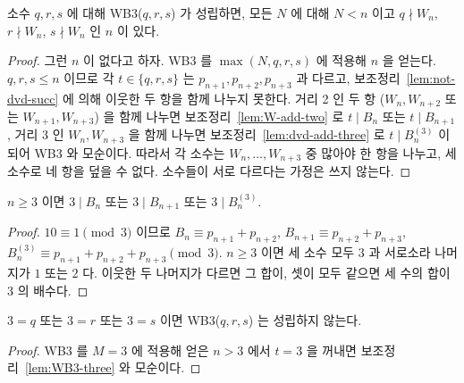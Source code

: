 \begin{theorem}[WB3 에서 Q1, \(S = \{q, r, s\}\)]
  \label{thm:three-of-window}
  \leanok
  소수 \(q, r, s\) 에 대해 WB3(\(q, r, s\)) 가 성립하면, 모든 \(N\) 에 대해 \(N < n\) 이고
  \(q \nmid W_n\), \(r \nmid W_n\), \(s \nmid W_n\) 인 \(n\) 이 있다.
\end{theorem}
\begin{proof}
  \leanok
  그런 \(n\) 이 없다고 하자. WB3 를 \(\max(N, q, r, s)\) 에 적용해 \(n\) 을 얻는다.
  \(q, r, s \le n\) 이므로 각 \(t \in \{q, r, s\}\) 는 \(p_{n+1}, p_{n+2}, p_{n+3}\) 과 다르고,
  보조정리~\ref{lem:not-dvd-succ} 에 의해 이웃한 두 항을 함께 나누지 못한다. 거리 2 인 두 항
  (\(W_n, W_{n+2}\) 또는 \(W_{n+1}, W_{n+3}\)) 을 함께 나누면 보조정리~\ref{lem:W-add-two} 로
  \(t \mid B_n\) 또는 \(t \mid B_{n+1}\), 거리 3 인 \(W_n, W_{n+3}\) 을 함께 나누면
  보조정리~\ref{lem:dvd-add-three} 로 \(t \mid B^{(3)}_n\) 이 되어 WB3 와 모순이다.
  따라서 각 소수는 \(W_n, \dots, W_{n+3}\) 중 많아야 한 항을 나누고, 세 소수로 네 항을 덮을 수 없다.
  소수들이 서로 다르다는 가정은 쓰지 않는다.
\end{proof}

\begin{lemma}
  \label{lem:WB3-three}
  \leanok
  \(n \ge 3\) 이면 \(3 \mid B_n\) 또는 \(3 \mid B_{n+1}\) 또는 \(3 \mid B^{(3)}_n\).
\end{lemma}
\begin{proof}
  \leanok
  \(10 \equiv 1 \pmod 3\) 이므로 \(B_n \equiv p_{n+1} + p_{n+2}\), \(B_{n+1} \equiv p_{n+2} + p_{n+3}\),
  \(B^{(3)}_n \equiv p_{n+1} + p_{n+2} + p_{n+3} \pmod 3\). \(n \ge 3\) 이면 세 소수 모두 \(3\) 과 서로소라
  나머지가 \(1\) 또는 \(2\) 다. 이웃한 두 나머지가 다르면 그 합이, 셋이 모두 같으면 세 수의 합이 \(3\) 의 배수다.
\end{proof}

\begin{corollary}[\(3\) 을 포함하면 WB3 는 거짓]
  \label{cor:not-WB3-three}
  \leanok
  \(3 = q\) 또는 \(3 = r\) 또는 \(3 = s\) 이면 WB3(\(q, r, s\)) 는 성립하지 않는다.
\end{corollary}
\begin{proof}
  \leanok
  WB3 를 \(M = 3\) 에 적용해 얻은 \(n > 3\) 에서 \(t = 3\) 을 꺼내면 보조정리~\ref{lem:WB3-three} 와 모순이다.
\end{proof}

